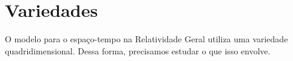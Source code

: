 


\section{Variedades}\label{sec:Variedades}

O modelo para o espaço-tempo na Relatividade Geral utiliza uma variedade quadridimensional. Dessa forma, precisamos estudar o que isso envolve.

